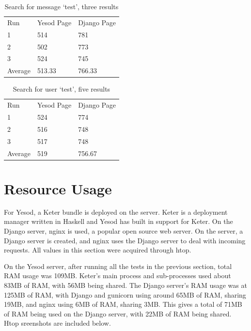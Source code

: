 \begin{table}[H]
	\caption{Search for message `test', three results}
	\begin{center}
		\begin{tabular}{ | l | l | l |}
			\hline
			Run & Yesod Page & Django Page \\
			1 & 514 & 781 \\
			2 & 502 & 773 \\
			3 & 524 & 745 \\
			Average & 513.33 & 766.33 \\
			\hline
		\end{tabular}
	\end{center}
	\label{tab:searchMessageLoadSpeeds}
\end{table}

\begin{table}[H]
	\caption{Search for user `test', five results}
	\begin{center}
		\begin{tabular}{ | l | l | l |}
			\hline
			Run & Yesod Page & Django Page \\
			1 & 524 & 774 \\
			2 & 516 & 748 \\
			3 & 517 & 748 \\
			Average & 519 & 756.67 \\
			\hline
		\end{tabular}
	\end{center}
	\label{tab:searchUserLoadSpeeds}
\end{table}

\section{Resource Usage}

For Yesod, a Keter bundle is deployed on the server. Keter is a deployment
manager written in Haskell and Yesod has built in support for Keter. On
the Django server, nginx is used, a popular open source web server. On the
server, a Django server is created, and nginx uses the Django server to
deal with incoming requests. All values in this section were acquired
through htop.

On the Yesod server, after running all the tests in the previous section,
total RAM usage was 109MB. Keter's main process and sub-processes used about 
83MB of RAM, with 56MB being shared. The Django
server's RAM usage was at 125MB of RAM, with Django and gunicorn using around
65MB of RAM, sharing 19MB, and nginx using 6MB of RAM, sharing 3MB. This gives
a total of 71MB of RAM being used on the Django server, with 22MB of RAM being
shared. Htop sreenshots are included below.

